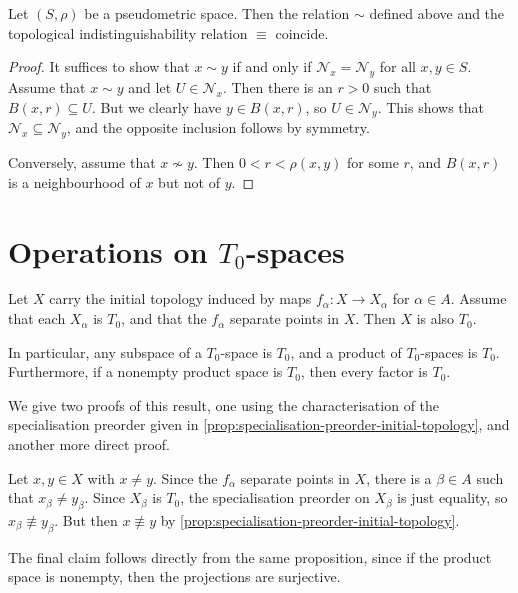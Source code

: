 \documentclass[article, a4paper, 11pt, oneside]{memoir}
\numberwithin{equation}{chapter}
\newcommand{\calN}{\mathcal{N}}
\newcommand{\nhoodfilter}[1]{\calN_{#1}}
\begin{document}
\begin{proposition}
    Let $(S,\rho)$ be a pseudometric space. Then the relation $\sim$ defined above and the topological indistinguishability relation $\equiv$ coincide.
\end{proposition}

\begin{proof}
    It suffices to show that $x \sim y$ if and only if $\nhoodfilter{x} = \nhoodfilter{y}$ for all $x,y \in S$. Assume that $x \sim y$ and let $U \in \nhoodfilter{x}$. Then there is an $r > 0$ such that $B(x,r) \subseteq U$. But we clearly have $y \in B(x,r)$, so $U \in \nhoodfilter{y}$. This shows that $\nhoodfilter{x} \subseteq \nhoodfilter{y}$, and the opposite inclusion follows by symmetry.

    Conversely, assume that $x \not\sim y$. Then $0 < r < \rho(x,y)$ for some $r$, and $B(x,r)$ is a neighbourhood of $x$ but not of $y$.
\end{proof}


\section[Operations on T0-spaces][Operations on $T_0$-spaces]{Operations on $T_0$-spaces}


\begin{proposition}
    \label{thm:T0-initial-topology}
    Let $X$ carry the initial topology induced by maps $f_\alpha \colon X \to X_\alpha$ for $\alpha \in A$. Assume that each $X_\alpha$ is $T_0$, and that the $f_\alpha$ separate points in $X$. Then $X$ is also $T_0$.

    In particular, any subspace of a $T_0$-space is $T_0$, and a product of $T_0$-spaces is $T_0$. Furthermore, if a nonempty product space is $T_0$, then every factor is $T_0$. %
\end{proposition}
%
We give two proofs of this result, one using the characterisation of the specialisation preorder given in \cref{prop:specialisation-preorder-initial-topology}, and another more direct proof.

\begin{proofof}[Proof 1]
    Let $x,y \in X$ with $x \neq y$. Since the $f_\alpha$ separate points in $X$, there is a $\beta \in A$ such that $x_\beta \neq y_\beta$. Since $X_\beta$ is $T_0$, the specialisation preorder on $X_\beta$ is just equality, so $x_\beta \not\equiv y_\beta$. But then $x \not\equiv y$ by \cref{prop:specialisation-preorder-initial-topology}.

    The final claim follows directly from the same proposition, since if the product space is nonempty, then the projections are surjective.
\end{proofof}
\end{document}
